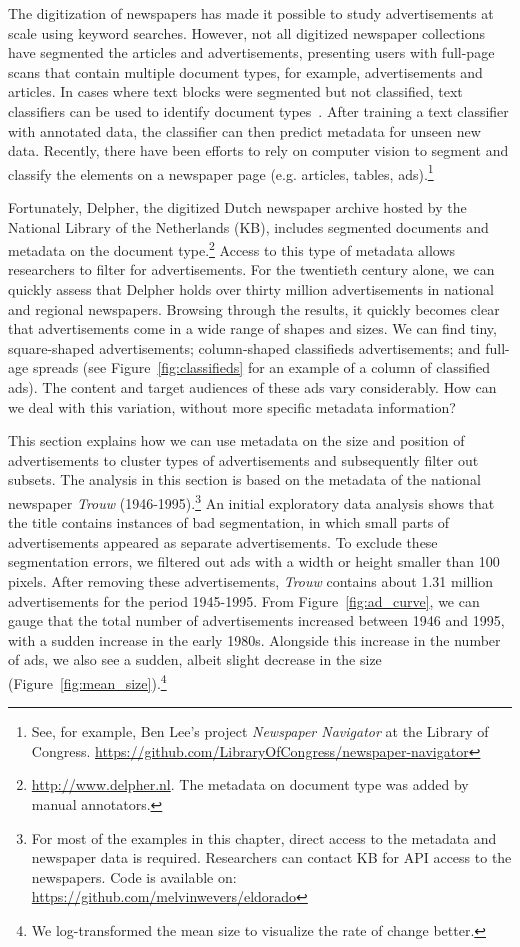 \documentclass[USenglish]{article}
\begin{document}
The digitization of newspapers has made it possible to study advertisements at scale using keyword searches. However, not all digitized newspaper collections have segmented the articles and advertisements, presenting users with full-page scans that contain multiple document types, for example, advertisements and articles. In cases where text blocks were segmented but not classified, text classifiers can be used to identify document types~\cite{bilgin_utilizing_2018}. After training a text classifier with annotated data, the classifier can then predict metadata for unseen new data. Recently, there have been efforts to rely on computer vision to segment and classify the elements on a newspaper page (e.g. articles, tables, ads).\footnote{See, for example, Ben Lee's project \textit{Newspaper Navigator} at the Library of Congress. \url{https://github.com/LibraryOfCongress/newspaper-navigator}} 

Fortunately, Delpher, the digitized Dutch newspaper archive hosted by the National Library of the Netherlands (KB), includes segmented documents and metadata on the document type.\footnote{\url{http://www.delpher.nl}. The metadata on document type was added by manual annotators.} Access to this type of metadata allows researchers to filter for advertisements. For the twentieth century alone, we can quickly assess that Delpher holds over thirty million advertisements in national and regional newspapers. Browsing through the results, it quickly becomes clear that advertisements come in a wide range of shapes and sizes. We can find tiny, square-shaped advertisements;  column-shaped classifieds advertisements; and full-age spreads (see Figure~\ref{fig:classifieds} for an example of a column of classified ads). The content and target audiences of these ads vary considerably. How can we deal with this variation, without more specific metadata information? 

%
This section explains how we can use metadata on the size and position of advertisements to cluster types of advertisements and subsequently filter out subsets. The analysis in this section is based on the metadata of the national newspaper \textit{Trouw} (1946-1995).\footnote{For most of the examples in this chapter, direct access to the metadata and newspaper data is required. Researchers can contact KB for API access to the newspapers. Code is available on: \url{https://github.com/melvinwevers/eldorado}} An initial exploratory data analysis shows that the title contains instances of bad segmentation, in which small parts of advertisements appeared as separate advertisements. To exclude these segmentation errors, we filtered out ads with a width or height smaller than 100 pixels. After removing these advertisements, \textit{Trouw} contains about 1.31 million advertisements for the period 1945-1995. From Figure~\ref{fig:ad_curve}, we can gauge that the total number of advertisements increased between 1946 and 1995, with a sudden increase in the early 1980s. Alongside this increase in the number of ads, we also see a sudden, albeit slight decrease in the size (Figure~\ref{fig:mean_size}).\footnote{We log-transformed the mean size to visualize the rate of change better.}
\end{document}
